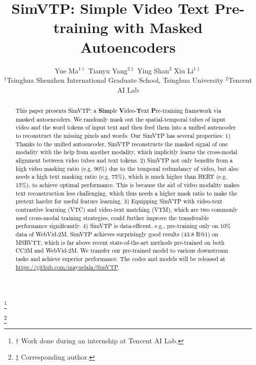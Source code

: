\documentclass[10pt,twocolumn,letterpaper]{article}
\newcommand{\yty}[1]{\textcolor{black}{#1}}
\begin{document}
	
\title{SimVTP: Simple Video Text Pre-training with Masked Autoencoders}
	
\author{Yue Ma$^{1\dagger}$ \quad
Tianyu Yang$^{2\ddagger}$ \quad
Ying Shan$^2$ \quad
Xiu Li$^{1\ddagger}$ \\
$^1$Tsinghua Shenzhen International Graduate School, Tsinghua University \quad 
$^2$Tencent AI Lab
}
\maketitle


\newcommand\blfootnote[1]{\begingroup
  \renewcommand\thefootnote{}\footnote{#1}\addtocounter{footnote}{-1}\endgroup
}

\blfootnote{$\dagger$ Work done during an internship at Tencent AI Lab.}
\blfootnote{$\ddagger$ Corresponding author.}

\begin{abstract}
	
	\yty{This paper presents SimVTP: a \textbf{Sim}ple \textbf{V}ideo-\textbf{T}ext \textbf{P}re-training framework via masked autoencoders. We randomly mask out the spatial-temporal tubes of input video and the word tokens of input text and then feed them into a unified autencoder to reconstruct the missing pixels and words.  Our SimVTP has several properties: 1) Thanks to the unified autoencoder,  SimVTP reconstructs the masked signal of one modality with the help from another modality, which implicitly learns the cross-modal alignment between video tubes and text tokens. 2) SimVTP not only benefits from a high video masking ratio (e.g. 90\%) due to the temporal redundancy of video, but also needs a high text masking ratio (e.g. 75\%), which is much higher than BERT (e.g. 15\%), to achieve optimal performance.  This is because the aid of video modality makes text reconstruction less challenging, which thus needs a higher mask ratio to make the pretext harder for useful feature learning. 3) Equipping SimVTP with video-text contrastive learning (VTC) and video-text matching (VTM), which are two commonly used cross-modal training strategies, could further improve the transferable performance significantly. 4) SimVTP is data-efficent, e.g., pre-training only on 10\% data of WebVid-2M, SimVTP achieves surprisingly good results (43.8 R@1) on MSRVTT, which is far above recent state-of-the-art methods pre-trained on both CC3M and WebVid-2M.  We transfer our pre-trained model to various downstream tasks and achieve superior performance. The codes and models will be released at \href{https://github.com/mayuelala/SimVTP}{https://github.com/mayuelala/SimVTP}.
 }
	
\end{abstract}
\end{document}
